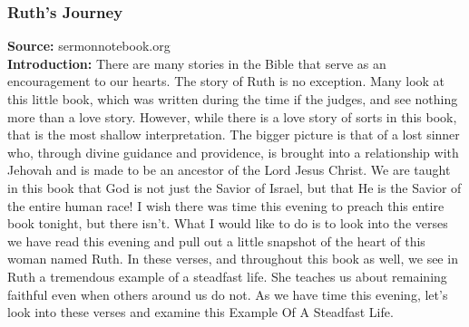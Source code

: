 \subsubsection{Ruth's Journey}
\textbf{Source: }sermonnotebook.org\\
\textbf{Introduction: }There are many stories in the Bible that serve as an encouragement to our hearts. The story of Ruth is no exception. Many look at this little book, which was written during the time if the judges, and see nothing more than a love story. However, while there is a love story of sorts in this book, that is the most shallow interpretation. The bigger picture is that of a lost sinner who, through divine guidance and providence, is brought into a relationship with Jehovah and is made to be an ancestor of the Lord Jesus Christ. We are taught in this book that God is not just the Savior of Israel, but that He is the Savior of the entire human race!
I wish there was time this evening to preach this entire book tonight, but there isn't. What I would like to do is to look into the verses we have read this evening and pull out a little snapshot of the heart of this woman named Ruth. In these verses, and throughout this book as well, we see in Ruth a tremendous example of a steadfast life. She teaches us about remaining faithful even when others around us do not. As we have time this evening, let's look into these verses and examine this Example Of A Steadfast Life.%
